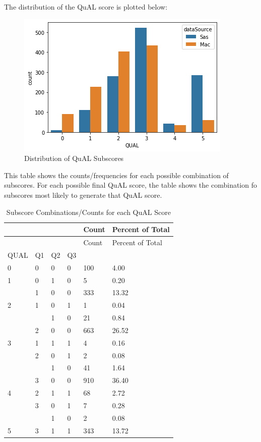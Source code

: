 \documentclass[
  letterpaper,
  DIV=11,
  numbers=noendperiod]{scrartcl}
\begin{document}
The distribution of the QuAL score is plotted below:

\begin{figure}

{\centering \includegraphics{results_lite_files/figure-pdf/fig-distqual-output-1.png}

}

\caption{\label{fig-distqual}Distribution of QuAL Subscores}

\end{figure}

This table shows the counts/frequencies for each possible combination of
subscores. For each possible final QuAL score, the table shows the
combination fo subscores most likely to generate that QuAL score.

\hypertarget{tbl-qualcounts}{}
\begin{longtable}[]{@{}llllll@{}}
\caption{\label{tbl-qualcounts}Subscore Combinations/Counts for each
QuAL Score}\tabularnewline
\toprule()
& & & & Count & Percent of Total \\
\midrule()
\endfirsthead
\toprule()
& & & & Count & Percent of Total \\
\midrule()
\endhead
QUAL & Q1 & Q2 & Q3 & & \\
0 & 0 & 0 & 0 & 100 & 4.00 \\
1 & 0 & 1 & 0 & 5 & 0.20 \\
& 1 & 0 & 0 & 333 & 13.32 \\
2 & 1 & 0 & 1 & 1 & 0.04 \\
& & 1 & 0 & 21 & 0.84 \\
& 2 & 0 & 0 & 663 & 26.52 \\
3 & 1 & 1 & 1 & 4 & 0.16 \\
& 2 & 0 & 1 & 2 & 0.08 \\
& & 1 & 0 & 41 & 1.64 \\
& 3 & 0 & 0 & 910 & 36.40 \\
4 & 2 & 1 & 1 & 68 & 2.72 \\
& 3 & 0 & 1 & 7 & 0.28 \\
& & 1 & 0 & 2 & 0.08 \\
5 & 3 & 1 & 1 & 343 & 13.72 \\
\bottomrule()
\end{longtable}
\end{document}
